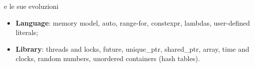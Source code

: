 \documentclass[12pt]{beamer}
\begin{document}
\begin{frame}[fragile]{\cplusplus e le sue evoluzioni}
\begin{itemize}[<+- | alert@+>]
        \begin{itemize}\footnotesize
            \item \textbf{Language}: memory model, auto, range-for, constexpr, lambdas, user-defined literals;
            \item \textbf{Library}: threads and locks, future, unique\_ptr, shared\_ptr, array, time and clocks, random numbers, unordered containers (hash tables).
        \end{itemize}
    \end{itemize}
    
\end{frame}
\end{document}
